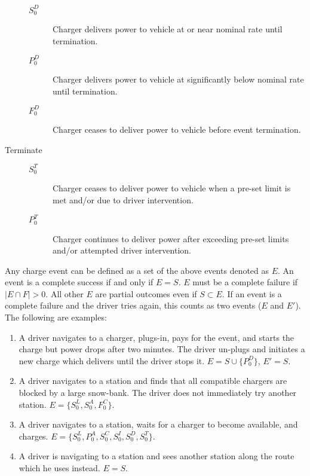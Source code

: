 \documentclass[11pt]{article}
\begin{document}
\begin{description}
\begin{description}
		\item[]
		\item[$S^D_0$] Charger delivers power to vehicle at or near nominal rate until termination.
		\item[$P^D_0$] Charger delivers power to vehicle at significantly below nominal rate until termination.
		\item[$F^D_0$] Charger ceases to deliver power to vehicle before event termination.
	\end{description}
	\item[Terminate] \begin{description}
		\item[]
		\item[$S^T_0$] Charger ceases to deliver power to vehicle when a pre-set limit is met and/or due to driver intervention.
		\item[$P^T_0$] Charger continues to deliver power after exceeding pre-set limits and/or attempted driver intervention.
	\end{description}
\end{description}

Any charge event can be defined as a set of the above events denoted as $E$. An event is a complete success if and only if $E = S$. $E$ must be a complete failure if $|E\cap F| > 0$. All other $E$ are partial outcomes even if $S \subset E$. If an event is a complete failure and the driver tries again, this counts as two events ($E$ and $E'$). The following are examples: 

\begin{enumerate}
	\item A driver navigates to a charger, plugs-in, pays for the event, and starts the charge but power drops after two minutes. The driver un-plugs and initiates a new charge which delivers until the driver stops it. $E = S \cup \{P^D_0\}$, $E' = S$.
	\item A driver navigates to a station and finds that all compatible chargers are blocked by a large snow-bank. The driver does not immediately try another station. $E = \{S^L_0, S^A_0, F^C_0\}$.
	\item A driver navigates to a station, waits for a charger to become available, and charges. $E = \{S^L_0, P^A_0, S^C_0, S^I_0, S^D_0, S^T_0\}$.
	\item A driver is navigating to a station and sees another station along the route which he uses instead. $E = S$.
\end{enumerate}
\end{document}
